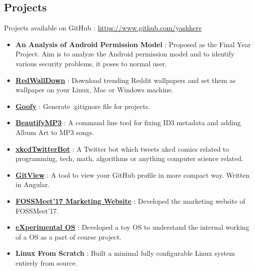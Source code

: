 \documentclass[margin, centered, 10.5pt]{res}
\begin{document}
\begin{resume}
\section{Projects}
Projects available on GitHub : \url{https://www.github.com/yashhere}
\begin{itemize}[leftmargin=*]
\item \textbf {An Analysis of Android Permission Model} : Proposed as the Final Year Project. Aim is to analyze the Android permission model and to identify various security problems, it poses to normal user.
\item \textbf{\href{https://github.com/yashhere/RedWallDown}{RedWallDown}} : Download trending Reddit wallpapers and set them as wallpaper on your Linux, Mac or Windows machine.
\item \textbf{\href{https://github.com/yashhere/goofy}{Goofy}} : Generate .gitignore file for projects.
\item \textbf{\href{https://github.com/yashhere/BeautifyMP3}{BeautifyMP3}} : A command line tool for fixing ID3 metadata and adding Album Art to MP3 songs.
\item \textbf{\href{https://github.com/yashhere/xkcdTwitterBot}{xkcdTwitterBot}} : A Twitter bot which tweets xkcd comics related to programming, tech, math, algorithms or anything computer science related.
\item \textbf{\href{https://github.com/yashhere/GitView}{GitView}} : A tool to view your GitHub profile in more compact way. Written in Angular.
\item \textbf{\href{https://fosscell.github.io/2017/index.html}{FOSSMeet'17 Marketing Website}} : Developed the marketing website of FOSSMeet'17.
\item \textbf{\href{https://github.com/yashhere/ExperimentalOS}{eXperimental OS}} : Developed a toy OS to understand the internal working of a OS as a part of course project.
\item \textbf{{Linux From Scratch}} : Built a minimal fully configurable Linux system entirely from source.
\end{itemize}



\end{resume}
\end{document}
